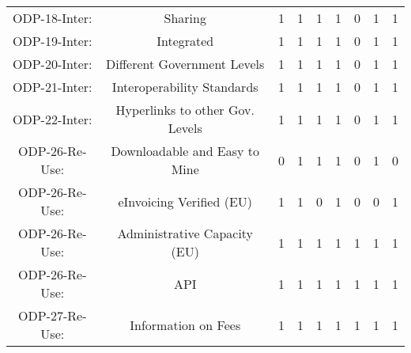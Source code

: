 \documentclass[a4paper, twoside]{report}
\begin{document}
\begin{table}[htbp]
\begin{adjustbox}{max width=\linewidth}
\begin{tabular}{rcccccccc}
    \midrule
    \multicolumn{1}{c}{ODP-18-Inter:} & \multicolumn{1}{p{19em}}{Sharing} & 1     & 1     & 1     & 1     & 0     & 1     & 1 \\
    \multicolumn{1}{c}{ODP-19-Inter:} & \multicolumn{1}{p{19em}}{Integrated} & 1     & 1     & 1     & 1     & 0     & 1     & 1 \\
    \multicolumn{1}{c}{ODP-20-Inter:} & \multicolumn{1}{p{19em}}{Different Government Levels} & 1     & 1     & 1     & 1     & 0     & 1     & 1 \\
    \multicolumn{1}{c}{ODP-21-Inter:} & \multicolumn{1}{p{19em}}{\cellcolor[rgb]{ .749,  .749,  .749}Interoperability Standards} & \cellcolor[rgb]{ .749,  .749,  .749}1 & \cellcolor[rgb]{ .749,  .749,  .749}1 & \cellcolor[rgb]{ .749,  .749,  .749}1 & \cellcolor[rgb]{ .749,  .749,  .749}1 & \cellcolor[rgb]{ .749,  .749,  .749}0 & \cellcolor[rgb]{ .749,  .749,  .749}1 & \cellcolor[rgb]{ .749,  .749,  .749}1 \\
    \multicolumn{1}{c}{ODP-22-Inter:} & \multicolumn{1}{p{19em}}{\cellcolor[rgb]{ .749,  .749,  .749}Hyperlinks to other Gov. Levels} & \cellcolor[rgb]{ .749,  .749,  .749}1 & \cellcolor[rgb]{ .749,  .749,  .749}1 & \cellcolor[rgb]{ .749,  .749,  .749}1 & \cellcolor[rgb]{ .749,  .749,  .749}1 & \cellcolor[rgb]{ .749,  .749,  .749}0 & \cellcolor[rgb]{ .749,  .749,  .749}1 & \cellcolor[rgb]{ .749,  .749,  .749}1 \\
    \midrule
    \multicolumn{1}{c}{ODP-26-Re-Use:} & \multicolumn{1}{p{19em}}{Downloadable and Easy to Mine} & 0     & 1     & 1     & 1     & 0     & 1     & 0 \\
    \multicolumn{1}{c}{ODP-26-Re-Use:} & \multicolumn{1}{p{19em}}{\cellcolor[rgb]{ .749,  .749,  .749}eInvoicing Verified (EU)} & \cellcolor[rgb]{ .749,  .749,  .749}1 & \cellcolor[rgb]{ .749,  .749,  .749}1 & \cellcolor[rgb]{ .749,  .749,  .749}0 & \cellcolor[rgb]{ .749,  .749,  .749}1 & \cellcolor[rgb]{ .749,  .749,  .749}0 & \cellcolor[rgb]{ .749,  .749,  .749}0 & \cellcolor[rgb]{ .749,  .749,  .749}1 \\
    \multicolumn{1}{c}{ODP-26-Re-Use:} & \multicolumn{1}{p{19em}}{Administrative Capacity (EU)} & 1     & 1     & 1     & 1     & 1     & 1     & 1 \\
    \multicolumn{1}{c}{ODP-26-Re-Use:} & \multicolumn{1}{p{19em}}{API} & 1     & 1     & 1     & 1     & 1     & 1     & 1 \\
    \multicolumn{1}{c}{ODP-27-Re-Use:} & \multicolumn{1}{p{19em}}{\cellcolor[rgb]{ .749,  .749,  .749}Information on Fees} & \cellcolor[rgb]{ .749,  .749,  .749}1 & \cellcolor[rgb]{ .749,  .749,  .749}1 & \cellcolor[rgb]{ .749,  .749,  .749}1 & \cellcolor[rgb]{ .749,  .749,  .749}1 & \cellcolor[rgb]{ .749,  .749,  .749}1 & \cellcolor[rgb]{ .749,  .749,  .749}1 & \cellcolor[rgb]{ .749,  .749,  .749}1 \\

\end{tabular}
\end{adjustbox}
\end{table}
\end{document}
